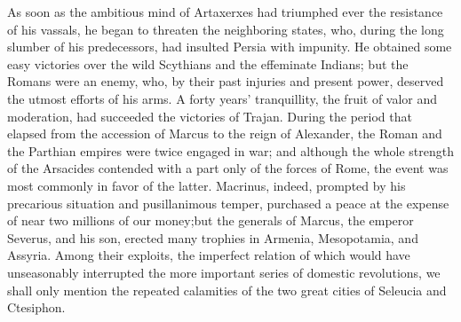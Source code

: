 As soon as the ambitious mind of Artaxerxes had triumphed ever
the resistance of his vassals, he began to threaten the
neighboring states, who, during the long slumber of his
predecessors, had insulted Persia with impunity. He obtained some
easy victories over the wild Scythians and the effeminate
Indians; but the Romans were an enemy, who, by their past
injuries and present power, deserved the utmost efforts of his
arms. A forty years’ tranquillity, the fruit of valor and
moderation, had succeeded the victories of Trajan. During the
period that elapsed from the accession of Marcus to the reign of
Alexander, the Roman and the Parthian empires were twice engaged
in war; and although the whole strength of the Arsacides
contended with a part only of the forces of Rome, the event was
most commonly in favor of the latter. Macrinus, indeed, prompted
by his precarious situation and pusillanimous temper, purchased a
peace at the expense of near two millions of our money;\footnotemark[37] but
the generals of Marcus, the emperor Severus, and his son, erected
many trophies in Armenia, Mesopotamia, and Assyria. Among their
exploits, the imperfect relation of which would have unseasonably
interrupted the more important series of domestic revolutions, we
shall only mention the repeated calamities of the two great
cities of Seleucia and Ctesiphon.


